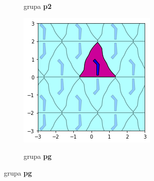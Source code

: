 \documentclass[11pt]{article}
\begin{document}
\begin{samepage}
\begin{figure}[H]
\begin{subfigure}[b]{0.3\textwidth}
    \label{fig:f21}
    \caption{grupa \textbf{p2}}
  \end{subfigure}
  \begin{subfigure}[b]{0.3\textwidth}
    \includegraphics[width=\textwidth]{output_21_10.png}
    \label{fig:f24}
    \caption{grupa \textbf{pg}}
  \end{subfigure}


\end{figure}
\end{samepage}
\end{document}
